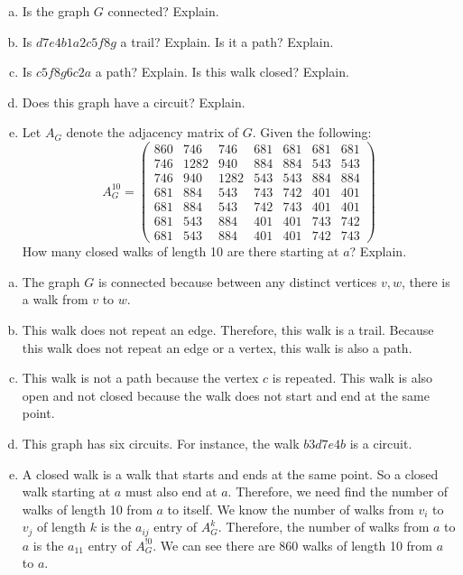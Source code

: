 \documentclass[11pt,letterpaper]{article}
\begin{document}

\begin{enumerate}[(a)]
\item Is the graph $G$ connected? Explain.
\item Is $d7e4b1a2c5f8g$ a trail? Explain. Is it a path? Explain.
\item Is $c5f8g6c2a$ a path? Explain. Is this walk closed? Explain.
\item Does this graph have a circuit? Explain. 
\item Let $A_G$ denote the adjacency matrix of $G$. Given the following:
	\[
	A_G^{10}=
	\begin{pmatrix}
	860 & 746 & 746 & 681 & 681 & 681 & 681 \\
	746 & 1282 & 940 & 884 & 884 & 543 & 543 \\
	746 & 940 & 1282 & 543 & 543 & 884 & 884 \\
	681 & 884 & 543 & 743 & 742 & 401 & 401 \\
	681 & 884 & 543 & 742 & 743 & 401 & 401 \\
	681 & 543 & 884 & 401 & 401 & 743 & 742 \\
	681 & 543 & 884 & 401 & 401 & 742 & 743
	\end{pmatrix}
	\]
How many closed walks of length 10 are there starting at $a$? Explain. 
\end{enumerate} \pspace

\sol 
\begin{enumerate}[(a)]
\item The graph $G$ is connected because between any distinct vertices $v, w$, there is a walk from $v$ to $w$. \pspace

\item This walk does not repeat an edge. Therefore, this walk is a trail. Because this walk does not repeat an edge or a vertex, this walk is also a path. \pspace

\item This walk is not a path because the vertex $c$ is repeated. This walk is also open and not closed because the walk does not start and end at the same point. \pspace

\item This graph has six circuits. For instance, the walk $b3d7e4b$ is a circuit. \pspace

\item A closed walk is a walk that starts and ends at the same point. So a closed walk starting at $a$ must also end at $a$. Therefore, we need find the number of walks of length 10 from $a$ to itself. We know the number of walks from $v_i$ to $v_j$ of length $k$ is the $a_{ij}$ entry of $A_G^k$. Therefore, the number of walks from $a$ to $a$ is the $a_{11}$ entry of $A_G^{!0}$. We can see there are 860 walks of length 10 from $a$ to $a$. 
\end{enumerate}
\end{document}
